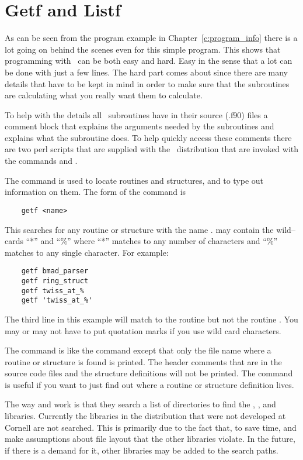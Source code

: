 \section{Getf and Listf}
\label{s:getf}

As can be seen from the program example in Chapter~\ref{c:program_info}
there is a lot going on behind the scenes even for this
simple program. This shows that programming with \bmad\ can be both easy
and hard. Easy in the sense that a lot can be done with just a few
lines. The hard part comes about since there are many details that
have to be kept in mind in order to make sure that the subroutines
are calculating what you really want them to calculate.

To help with the details all \bmad\ subroutines have in their source (.f90)
files a comment block that explains the arguments needed by the
subroutines and explains what the subroutine does. To help quickly
access these comments there are two perl scripts that are supplied
with the \bmad\ distribution that are invoked with the commands
 and .

The  command is used to locate routines and structures, and
to type out information on them.  The form of the command is
\begin{verbatim}
    getf <name>
\end{verbatim}
This searches for any routine or structure with the name
.  may contain the wild--cards ``*'' and ``\%'' where
``*'' matches to any number of characters and ``\%'' matches to any
single character. For example:
\begin{verbatim}
    getf bmad_parser
    getf ring_struct
    getf twiss_at_%
    getf 'twiss_at_%'
\end{verbatim}
The third line in this example will match to the routine
 but not the routine . You may or may not
have to put quotation marks if you use wild card characters.

The  command is like the  command except that only
the file name where a routine or structure is found is printed. The
header comments that are in the source code files and the structure
definitions will not be printed. The  command is useful if you
want to just find out where a routine or structure definition lives.

The way  and  work is that they search a list of
directories to find the \bmad, , and 
libraries. Currently the libraries in the \bmad distribution that were
not developed at Cornell are not searched. This is primarily due to
the fact that, to save time,  and  make assumptions
about file layout that the other libraries violate. In the future, if
there is a demand for it, other libraries may be added to the search
paths.


